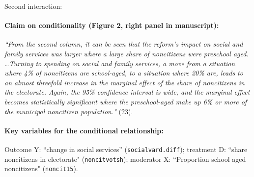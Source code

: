 \documentclass[12pt]{article}
\begin{document}
\clearpage




\noindent Second interaction:

\paragraph{Claim on conditionality (Figure 2, right panel in manuscript):} \emph{``From the second column, it can be seen that the reform's impact on social and family services was larger where a large share of noncitizens were preschool aged. \ldots Turning to spending on social and family services, a move from a situation where 4\% of noncitizens are school-aged, to a situation where 20\% are, leads to an almost threefold increase in the marginal effect of the share of noncitizens in the electorate. Again, the 95\% confidence interval is wide, and the marginal effect becomes statistically significant where the preschool-aged make up 6\% or more of the municipal noncitizen population."} (23). 

\paragraph{Key variables for the conditional relationship:} Outcome Y:
``change in social services'' (\texttt{socialvard.diff}); treatment D: ``share noncitizens in electorate" (\texttt{noncitvotsh}); moderator X: ``Proportion school aged noncitizens"
(\texttt{noncit15}).



\newpage
\end{document}
